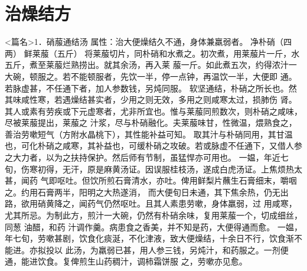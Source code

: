 \documentclass[a4paper,12pt,UTF8,twoside]{ctexbook}
\begin{document}
\chapter{治燥结方}
<篇名>1．硝菔通结汤
属性：治大便燥结久不通，身体兼羸弱者。 
净朴硝（四两） 鲜莱菔（五斤） 
将莱菔切片，同朴硝和水煮之。初次煮，用莱菔片一斤，水五斤，煮至莱菔烂熟捞出。就其余汤，再入莱 
菔一斤。如此煮五次，约得浓汁一大碗，顿服之。若不能顿服者，先饮一半，停一点钟，再温饮一半，大便即 
通。若脉虚甚，不任通下者，加人参数钱，另炖同服。 
软坚通结，朴硝之所长也。然其味咸性寒，若遇燥结甚实者，少用之则无效，多用之则咸寒太过，损肺伤 
肾。其人或素有劳疾或下元虚寒者，尤非所宜也。惟与莱菔同煎数次，则朴硝之咸味，尽被莱菔提出，莱菔之 
汁浆，尽与朴硝融化。夫莱菔味甘，性微温，煨熟食之，善治劳嗽短气（方附水晶桃下），其性能补益可知。 
取其汁与朴硝同用，其甘温也，可化朴硝之咸寒，其补益也，可缓朴硝之攻破。若或脉虚不任通下，又借人参 
之大力者，以为之扶持保护。然后师有节制，虽猛悍亦可用也。 
一媪，年近七旬，伤寒初得，无汗，原是麻黄汤证。因误服桂枝汤，遂成白虎汤证。上焦烦热太甚，闻药 
气即呕吐。但饮所煎石膏清水，亦吐。俾用鲜梨片蘸生石膏细末，嚼咽之。约用石膏两半，阳明之大热遂消， 
而大便旬日未通，其下焦余热，仍无出路，欲用硝黄降之，闻药气仍然呕吐。且其人素患劳嗽，身体羸弱，过 
用咸寒，尤其所忌。为制此方，煎汁一大碗，仍然有朴硝余味，复用莱菔一个，切成细丝，同葱 油醋，和药 
汁调作羹。病患食之香美，并不知是药，大便得通而愈。 
一媪，年七旬，劳嗽甚剧，饮食化痰涎，不化津液，致大便燥结，十余日不行，饮食渐不能进。亦拟投以 
此汤，为羸弱已甚，用人参三钱，另炖汁，和药服之。一剂便通，能进饮食。复俾煎生山药稠汁，调柿霜饼服 
之，劳嗽亦见愈。 
\end{document}
